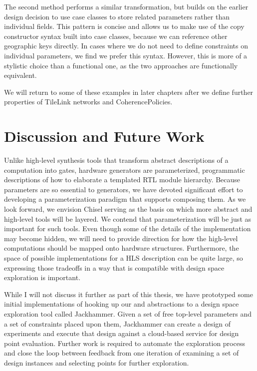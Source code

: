The second method performs a similar transformation, but builds on the earlier design decision
to use case classes to store related parameters rather than individual fields.
This pattern is concise and allows us to make use of the copy constructor syntax built into case classes, because we
can reference other geographic keys directly.
In cases where we do not need to define constraints on individual parameters, we find we prefer this syntax.
However, this is more of a stylistic choice than a functional one, as the two approaches
are functionally equivalent.

We will return to some of these examples in later chapters after we define further properties of TileLink networks and CoherencePolicies.

\section{Discussion and Future Work}
\label{sec:con}

Unlike high-level synthesis tools that transform abstract descriptions of a computation into gates,
hardware generators are parameterized, programmatic descriptions of how to elaborate a templated RTL module hierarchy.
Because parameters are so essential to generators, we have devoted significant effort to
developing a parameterization paradigm that supports composing them.
As we look forward, we envision Chisel serving as the basis on which more abstract and high-level tools will be layered.
We contend that parameterization will be just as important for such tools.
Even though some of the details of the implementation may become hidden,
we will need to provide direction for how the high-level computations should be mapped
onto hardware structures.
Furthermore, the space of possible implementations for a HLS description can be quite large,
so expressing those tradeoffs in a way that is compatible with design space exploration is important.

While I will not discuss it further as part of this thesis, we have prototyped some initial implementations
of hooking up our  and  abstractions to a design space exploration tool called Jackhammer.
Given a set of free top-level parameters and a set of constraints placed upon them, Jackhammer can create a design of experiments and
execute that design against a cloud-based service for design point evaluation.
Further work is required to automate the exploration process and close the loop between feedback from one iteration of examining a
set of design instances and selecting points for further exploration.


